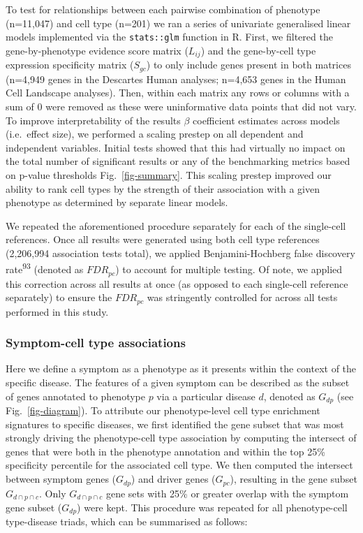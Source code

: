 \documentclass[
]{article}
\begin{document}
To test for relationships between each pairwise combination of phenotype
(n=11,047) and cell type (n=201) we ran a series of univariate
generalised linear models implemented via the \texttt{stats::glm}
function in R. First, we filtered the gene-by-phenotype evidence score
matrix (\(L_{ij}\)) and the gene-by-cell type expression specificity
matrix (\(S_{gc}\)) to only include genes present in both matrices
(n=4,949 genes in the Descartes Human analyses; n=4,653 genes in the
Human Cell Landscape analyses). Then, within each matrix any rows or
columns with a sum of 0 were removed as these were uninformative data
points that did not vary. To improve interpretability of the results
\(\beta\) coefficient estimates across models (i.e.~effect size), we
performed a scaling prestep on all dependent and independent variables.
Initial tests showed that this had virtually no impact on the total
number of significant results or any of the benchmarking metrics based
on p-value thresholds Fig.~\ref{fig-summary}. This scaling prestep
improved our ability to rank cell types by the strength of their
association with a given phenotype as determined by separate linear
models.

We repeated the aforementioned procedure separately for each of the
single-cell references. Once all results were generated using both cell
type references (2,206,994 association tests total), we applied
Benjamini-Hochberg false discovery rate\textsuperscript{93} (denoted as
\(FDR_{pc}\)) to account for multiple testing. Of note, we applied this
correction across all results at once (as opposed to each single-cell
reference separately) to ensure the \(FDR_{pc}\) was stringently
controlled for across all tests performed in this study.

\subsubsection{Symptom-cell type
associations}\label{symptom-cell-type-associations}

Here we define a symptom as a phenotype as it presents within the
context of the specific disease. The features of a given symptom can be
described as the subset of genes annotated to phenotype \(p\) via a
particular disease \(d\), denoted as \(G_{dp}\) (see
Fig.~\ref{fig-diagram}). To attribute our phenotype-level cell type
enrichment signatures to specific diseases, we first identified the gene
subset that was most strongly driving the phenotype-cell type
association by computing the intersect of genes that were both in the
phenotype annotation and within the top 25\% specificity percentile for
the associated cell type. We then computed the intersect between symptom
genes (\(G_{dp}\)) and driver genes (\(G_{pc}\)), resulting in the gene
subset \(G_{d \cap p \cap c}\). Only \(G_{d \cap p \cap c}\) gene sets
with 25\% or greater overlap with the symptom gene subset (\(G_{dp}\))
were kept. This procedure was repeated for all phenotype-cell
type-disease triads, which can be summarised as follows:
\end{document}
